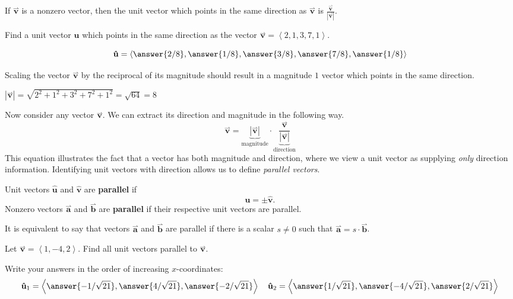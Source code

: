 \documentclass{ximera}
\renewcommand{\vec}[1]{{\overset{\boldsymbol{\rightharpoonup}}{\mathbf{#1}}}}
\newcommand{\uvec}[1]{\mathbf{\hat{#1}}}
\renewcommand{\vector}[1]{\left\langle #1\right\rangle}
\begin{document}
\begin{theorem}
  If $\vec{v}$ is a nonzero vector, then the unit vector which points
  in the same direction as $\vec{v}$ is $\frac{\vec{v}}{|\vec{v}|}$.
\end{theorem}


\begin{question}
  Find a unit vector $\uvec{u}$ which points in the same direction as the vector $\vec{v} = \vector{2,1,3,7,1}$.
  \begin{prompt}
  \[
  \uvec{u} = \vector{
    \answer{2/8},
    \answer{1/8},
    \answer{3/8},
    \answer{7/8},
    \answer{1/8}}
  \]
  \end{prompt}
  \begin{hint}
    Scaling the vector $\vec{v}$ by the reciprocal of its magnitude should result in a magnitude $1$ vector which points in the same direction.
  \end{hint}
  \begin{hint}
    $|\vec{v}| = \sqrt{2^2+1^2+3^2+7^2+1^2} = \sqrt{64} = 8$
  \end{hint}
\end{question}

Now consider any vector $\vec{v}$. We can  extract its direction
and magnitude in the following way.
\[
\vec{v} = \underbrace{|\vec{v}|}_{\text{magnitude}} \cdot \underbrace{\frac{\vec{v}}{|\vec{v}|}}_{\text{direction}}
\]
This equation illustrates the fact that a vector has both magnitude
and direction, where we view a unit vector as supplying \textit{only}
direction information. Identifying unit vectors with direction allows
us to define \textit{parallel vectors}.
\begin{definition}
Unit vectors $\uvec u$ and $\uvec v$ are \textbf{parallel} if
\[
\uvec{u} = \pm \uvec{v}.
\]
Nonzero vectors $\vec a$ and $\vec b$ are \textbf{parallel} if their
respective unit vectors are parallel.
\end{definition}
It is equivalent to say that vectors $\vec a$ and $\vec b$ are
parallel if there is a scalar $s\neq 0$ such that $\vec a =
s\cdot\vec b$.

\begin{question}
  Let $\vec{v} = \vector{1,-4,2}$. Find all unit vectors parallel to $\vec{v}$.
  \begin{prompt}
    Write your answers in the order of increasing $x$-coordinates:
    \[
    \uvec{u}_1 = \vector{\answer{-1/\sqrt{21}},\answer{4/\sqrt{21}},\answer{-2/\sqrt{21}}} \quad \uvec{u}_2 = \vector{\answer{1/\sqrt{21}},\answer{-4/\sqrt{21}},\answer{2/\sqrt{21}}}
    \]
  \end{prompt}
\end{question}
\end{document}
